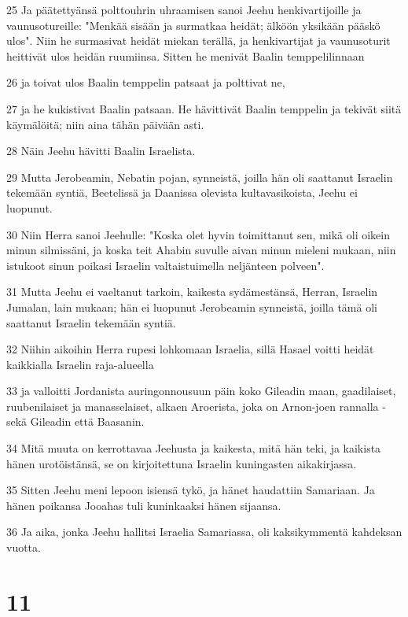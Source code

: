 \par 25 Ja päätettyänsä polttouhrin uhraamisen sanoi Jeehu henkivartijoille ja vaunusotureille: "Menkää sisään ja surmatkaa heidät; älköön yksikään pääskö ulos". Niin he surmasivat heidät miekan terällä, ja henkivartijat ja vaunusoturit heittivät ulos heidän ruumiinsa. Sitten he menivät Baalin temppelilinnaan
\par 26 ja toivat ulos Baalin temppelin patsaat ja polttivat ne,
\par 27 ja he kukistivat Baalin patsaan. He hävittivät Baalin temppelin ja tekivät siitä käymälöitä; niin aina tähän päivään asti.
\par 28 Näin Jeehu hävitti Baalin Israelista.
\par 29 Mutta Jerobeamin, Nebatin pojan, synneistä, joilla hän oli saattanut Israelin tekemään syntiä, Beetelissä ja Daanissa olevista kultavasikoista, Jeehu ei luopunut.
\par 30 Niin Herra sanoi Jeehulle: "Koska olet hyvin toimittanut sen, mikä oli oikein minun silmissäni, ja koska teit Ahabin suvulle aivan minun mieleni mukaan, niin istukoot sinun poikasi Israelin valtaistuimella neljänteen polveen".
\par 31 Mutta Jeehu ei vaeltanut tarkoin, kaikesta sydämestänsä, Herran, Israelin Jumalan, lain mukaan; hän ei luopunut Jerobeamin synneistä, joilla tämä oli saattanut Israelin tekemään syntiä.
\par 32 Niihin aikoihin Herra rupesi lohkomaan Israelia, sillä Hasael voitti heidät kaikkialla Israelin raja-alueella
\par 33 ja valloitti Jordanista auringonnousuun päin koko Gileadin maan, gaadilaiset, ruubenilaiset ja manasselaiset, alkaen Aroerista, joka on Arnon-joen rannalla - sekä Gileadin että Baasanin.
\par 34 Mitä muuta on kerrottavaa Jeehusta ja kaikesta, mitä hän teki, ja kaikista hänen urotöistänsä, se on kirjoitettuna Israelin kuningasten aikakirjassa.
\par 35 Sitten Jeehu meni lepoon isiensä tykö, ja hänet haudattiin Samariaan. Ja hänen poikansa Jooahas tuli kuninkaaksi hänen sijaansa.
\par 36 Ja aika, jonka Jeehu hallitsi Israelia Samariassa, oli kaksikymmentä kahdeksan vuotta.

\chapter{11}

